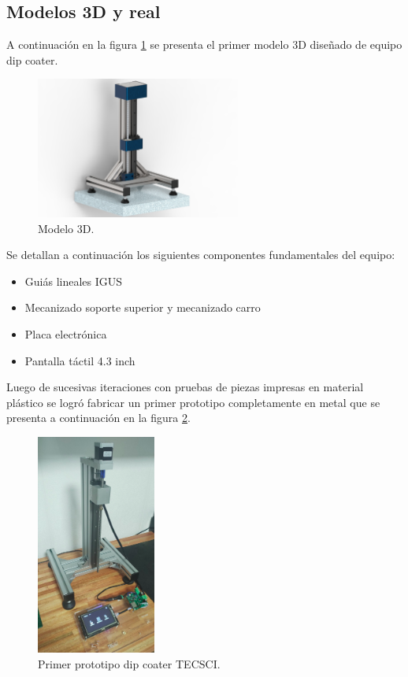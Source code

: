 \subsection{Modelos 3D y real}

A continuación en la figura \ref{fig:mecanica_3d_model} se presenta el primer modelo 3D diseñado de equipo dip coater.
\begin{figure}[h]
	\centering
	\includegraphics[width=0.6\textwidth]{./Figures/3d.jpg}
	\caption{Modelo 3D.}
	\label{fig:mecanica_3d_model}
\end{figure}

Se detallan a continuación los siguientes componentes fundamentales del equipo:

\begin{itemize}
\item Guiás lineales IGUS 
\item Mecanizado soporte superior y mecanizado carro
\item Placa electrónica
\item Pantalla táctil 4.3 inch
\end{itemize}

Luego de sucesivas iteraciones con pruebas de piezas impresas en material plástico se logró fabricar un primer prototipo completamente en metal que se presenta a continuación en la figura \ref{fig:mecanica_real_model}.

\begin{figure}[h]
	\centering
	\includegraphics[width=0.35\textwidth]{./Figures/real.png}
	\caption{Primer prototipo dip coater TECSCI.}
	\label{fig:mecanica_real_model}
\end{figure}

